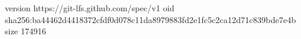 version https://git-lfs.github.com/spec/v1
oid sha256:ba44462d4418372cfdf0d078c11da8979883fd2e1fc5c2ca12d71c839bde7e4b
size 174916
